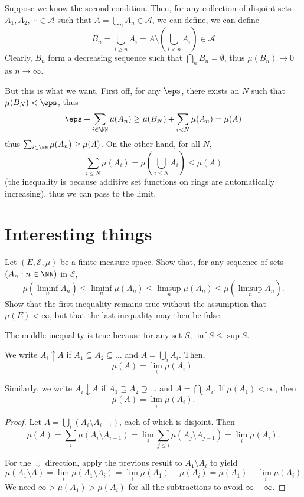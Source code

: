 \documentclass[11pt, headheight=30pt]{scrartcl}
\begin{document}
\begin{psec*}
    Suppose we know the second condition. Then, for any collection
    of disjoint sets $A_1, A_2, \cdots \in \mathcal{A}$ such
    that $A = \bigcup_n A_n \in \mathcal{A}$, we can define, we can define
    \[
        B_n = \bigcup_{i\geq n} A_i = A\setminus\left( \bigcup_{i < n} A_i \right) \in \mathcal{A}
    \]
    Clearly, $B_n$ form a decreasing sequence such that
    $\bigcap_n B_n = \emptyset$, thus $\mu(B_n) \to 0$ as $n\to \infty$.

    But this is what we want. First off, for any $\eps$, there exists an $N$
    such that $\mu(B_N) < \eps$, thus
    \[
        \eps + \sum_{i\in \NN} \mu(A_n) \geq \mu(B_N) + \sum_{i< N} \mu(A_n) = \mu(A)
    \]
    thus $\sum_{i\in \NN} \mu(A_n) \geq \mu(A)$. On the other hand,
    for all $N$,
    \[
        \sum_{i\leq N} \mu(A_i) = \mu\left(\bigcup_{i\leq N} A_i\right) \leq \mu(A)    
    \]
    (the inequality is because additive set functions
    on rings are automatically increasing), thus we can pass to the limit.
\end{psec*}

\pagebreak
\section{Interesting things}
\begin{prob*}
    Let $(E, \mathcal{E}, \mu)$ be a finite measure space. Show that, for
    any sequence of sets $(A_n : n \in \NN)$ in $\mathcal{E}$,
    \[
        \mu\left(\liminf_n A_n\right) \leq \liminf_n \mu(A_n) \leq
        \limsup_n \mu(A_n) \leq \mu\left(\limsup_n A_n\right).
    \]
    Show that the first inequality remains true without the
    assumption that $\mu(E) < \infty$, but that the last
    inequality may then be false.
\end{prob*}
The middle inequality is true because for any set $S$,
$\inf S \leq \sup S$.

\begin{claim*}
    We write $A_i \uparrow A$ if $A_1 \subseteq A_2 \subseteq \dots$
    and $A = \bigcup_i A_i$. Then,
    \[
        \mu(A) = \lim_i \mu(A_i).
    \]

    Similarly, we write $A_i \downarrow A$ if $A_1 \supseteq A_2 \supseteq \dots$
    and $A = \bigcap_i A_i$. If $\mu(A_1) < \infty$, then
    \[
        \mu(A) = \lim_i \mu(A_i).
    \]
\end{claim*}
\begin{proof}
    Let $A = \bigcup_i (A_i \setminus A_{i-1})$, each of which is disjoint.
    Then
    \[
        \mu(A) = \sum_i \mu(A_i \setminus A_{i-1})
        = \lim_i \sum_{j\leq i} \mu(A_j \setminus A_{j-1}) = \lim_i \mu(A_i).    
    \]

    For the $\downarrow$ direction, apply the previous
    result to $A_1 \setminus A_i$ to yield
    \[
        \mu(A_1\setminus A) = \lim_i \mu(A_1 \setminus A_i)
        = \lim_i \mu(A_1) - \mu(A_i) = \mu(A_1) - \lim_i \mu(A_i)
    \]
    We need $\infty > \mu(A_1) > \mu(A_i)$ for all the subtractions
    to avoid $\infty - \infty$.
\end{proof}
\end{document}
